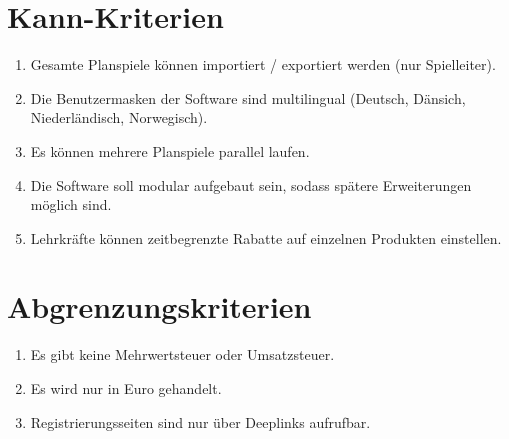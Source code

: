 \section{Kann-Kriterien}
\begin{enumerate}
    \item Gesamte Planspiele können importiert / exportiert werden (nur Spielleiter).
    \item Die Benutzermasken der Software sind multilingual (Deutsch, Dänsich, Niederländisch, Norwegisch).
    \item Es können mehrere Planspiele parallel laufen.
    \item Die Software soll modular aufgebaut sein, sodass spätere Erweiterungen möglich sind.
    \item Lehrkräfte können zeitbegrenzte Rabatte auf einzelnen Produkten einstellen.
\end{enumerate}

\section{Abgrenzungskriterien}
\begin{enumerate}
    \item Es gibt keine Mehrwertsteuer oder Umsatzsteuer.
    \item Es wird nur in Euro gehandelt.
    \item Registrierungsseiten sind nur über Deeplinks aufrufbar.
\end{enumerate}
